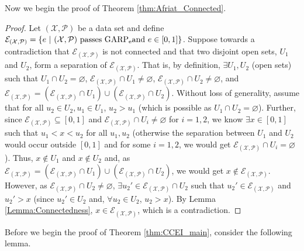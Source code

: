 \documentclass{article} %
\theoremstyle{style1}
\theoremstyle{style1}
\theoremstyle{example}
\begin{document}
Now we begin the proof of Theorem \ref{thm:Afriat_Connected}.
\begin{proof}
Let $(\mathcal{X},\mathcal{P})$ be a data set and define $\mathcal{E}_{(\mathcal{X},\mathcal{P})}=\{e\ |\ (\mathcal{X},\mathcal{P})\textrm{ passes GARP\textsubscript{e}}\\ \textrm{and } e\in[0,1]\}$. Suppose towards a contradiction that $\mathcal{E}_{(\mathcal{X},\mathcal{P})}$ is not connected and that two disjoint open sets, $U_1$ and $U_2$, form a separation of $\mathcal{E}_{(\mathcal{X},\mathcal{P})}$. That is, by definition, $\exists U_1,U_2$ (open sets) such that $U_1\cap U_2=\varnothing$, $\mathcal{E}_{(\mathcal{X},\mathcal{P})}\cap U_1\not=\varnothing$, $\mathcal{E}_{(\mathcal{X},\mathcal{P})}\cap U_2\not=\varnothing$, and $\mathcal{E}_{(\mathcal{X},\mathcal{P})}=(\mathcal{E}_{(\mathcal{X},\mathcal{P})}\cap U_1)\cup (\mathcal{E}_{(\mathcal{X},\mathcal{P})}\cap U_2)$. Without loss of generality, assume that for all $u_2\in U_2, u_1\in U_1$, $u_2>u_1$ (which is possible as $U_1\cap U_2=\varnothing$). Further, since $\mathcal{E}_{(\mathcal{X},\mathcal{P})}\subseteq [0,1]$ and $\mathcal{E}_{(\mathcal{X},\mathcal{P})}\cap U_i\not=\varnothing$ for $i=1,2$, we know $\exists x\in[0,1]$ such that $u_1<x<u_2$ for all $u_1,u_2$ (otherwise the separation between $U_1$ and $U_2$ would occur outside $[0,1]$ and for some $i=1,2$, we would get $\mathcal{E}_{(\mathcal{X},\mathcal{P})}\cap U_i=\varnothing$). Thus, $x\not\in U_1$ and $x\not\in U_2$ and, as $\mathcal{E}_{(\mathcal{X},\mathcal{P})}=(\mathcal{E}_{(\mathcal{X},\mathcal{P})}\cap U_1)\cup (\mathcal{E}_{(\mathcal{X},\mathcal{P})}\cap U_2)$, we would get $x\not\in\mathcal{E}_{(\mathcal{X},\mathcal{P})}$. However, as $\mathcal{E}_{(\mathcal{X},\mathcal{P})}\cap U_2\not=\varnothing$, $\exists u_2'\in \mathcal{E}_{(\mathcal{X},\mathcal{P})}\cap U_2$ such that $u_2'\in  \mathcal{E}_{(\mathcal{X},\mathcal{P})}$ and $u_2'>x$ (since $u_2'\in U_2$ and, $\forall u_2\in U_2$, $u_2>x$). By Lemma \ref{Lemma:Connectedness}, $x\in\mathcal{E}_{(\mathcal{X},\mathcal{P})}$, which is a contradiction.
\end{proof}



\CCEImain*

Before we begin the proof of Theorem \ref{thm:CCEI_main}, consider the following lemma.
\end{document}
